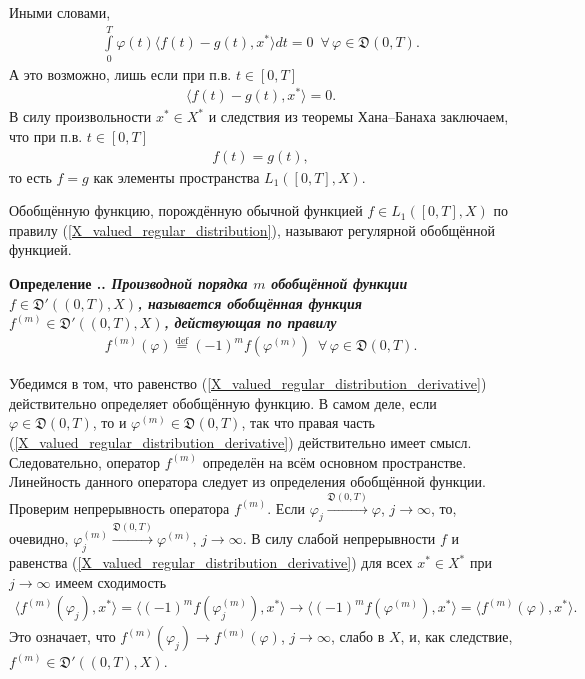 \documentclass{report}
\newcounter{defin}[section]
\renewcommand{\thedefin}{\thesection.\arabic{defin}}
\newenvironment{Definition}{\par\refstepcounter{defin}\bf Определение
\thedefin.\it}{\rm\par}
\begin{document}
Иными словами,
\begin{gather*}
\int\limits_0^T\varphi(t)\langle f(t)-g(t),x^*\rangle dt=0\,\,\,\forall\,\varphi\in\mathfrak{D}(0,T).
\end{gather*}
А это возможно, лишь если при п.в. $t\in[0,T]$
\begin{gather*}
\langle f(t)-g(t),x^*\rangle=0.
\end{gather*}
В силу произвольности $x^*\in X^*$ и следствия из теоремы Хана--Банаха заключаем, что при п.в. $t\in[0,T]$
\begin{gather*}
f(t)=g(t),
\end{gather*}
то есть $f=g$ как элементы пространства $L_1([0,T],X)$.

Обобщённую функцию, порождённую обычной функцией $f\in L_1([0,T],X)$ по правилу (\ref{X_valued_regular_distribution}), называют регулярной обобщённой функцией.
\begin{Definition}\label{X_valued_distribution_derivative:Definition}
Производной порядка $m$ обобщённой функции $f\in\mathfrak{D}'((0,T),X)$, называется обобщённая функция $f^{(m)}\in\mathfrak{D}'((0,T),X)$, действующая по правилу
\begin{gather}\label{X_valued_regular_distribution_derivative}
f^{(m)}(\varphi)\stackrel{\mathrm{def}}{=}(-1)^mf(\varphi^{(m)})\,\,\,\forall\,\varphi\in\mathfrak{D}(0,T).
\end{gather}
\end{Definition}

Убедимся в том, что равенство (\ref{X_valued_regular_distribution_derivative}) действительно определяет обобщённую функцию. В самом деле, если $\varphi\in\mathfrak{D}(0,T)$, то и
$\varphi^{(m)}\in\mathfrak{D}(0,T)$, так что правая часть (\ref{X_valued_regular_distribution_derivative}) действительно имеет смысл. Следовательно, оператор $f^{(m)}$ определён на всём
основном пространстве. Линейность данного оператора следует из определения обобщённой функции. Проверим непрерывность оператора $f^{(m)}$. Если $\varphi_j
\stackrel{\mathfrak{D}(0,T)}{\longrightarrow}\varphi$, $j\to\infty$, то, очевидно, $\varphi_j^{(m)}\stackrel{\mathfrak{D}(0,T)}{\longrightarrow}\varphi^{(m)}$, $j\to\infty$. В силу слабой
непрерывности $f$ и равенства (\ref{X_valued_regular_distribution_derivative}) для всех $x^*\in X^*$ при $j\to\infty$ имеем сходимость
\begin{gather*}
\langle f^{(m)}(\varphi_j),x^*\rangle=\langle (-1)^mf(\varphi^{(m)}_j),x^*\rangle\to \langle (-1)^mf(\varphi^{(m)}),x^*\rangle=\langle f^{(m)}(\varphi),x^*\rangle.
\end{gather*}
Это означает, что $f^{(m)}(\varphi_j)\to f^{(m)}(\varphi)$, $j\to\infty$, слабо в $X$, и, как следствие, $f^{(m)}\in\mathfrak{D}'((0,T),X)$.
\end{document}
